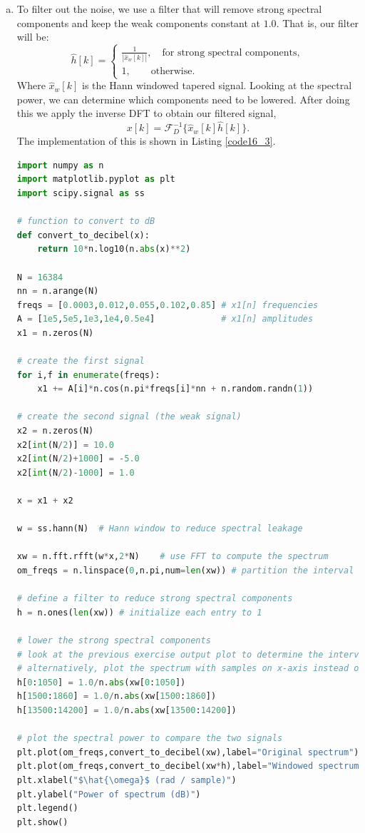 \begin{enumerate}
\begin{enumerate}[a)]
\item To filter out the noise, we use a filter that will remove strong spectral components and keep the 
weak components constant at $1.0$. That is, our filter will be:
$$\hat{h}[k]=\begin{cases}
    \frac{1}{|\hat{x}_{w}[k]|}, \quad \text{for strong spectral components}, \\
    1, \quad\quad \text{otherwise}.
\end{cases}$$
Where $\hat{x}_{w}[k]$ is the Hann windowed tapered signal. Looking at the spectral power, we can determine which components need to be lowered. 
After doing this we apply the inverse DFT to obtain our filtered signal,
$$x[k]=\mathcal{F}_{D}^{-1}\{\hat{x}_{w}[k]\hat{h}[k]\}.$$
The implementation of this is shown in Listing \ref{code16_3}.

\begin{lstlisting}[language=Python, caption=Filtering of the signal,label=code16_3]
import numpy as n
import matplotlib.pyplot as plt
import scipy.signal as ss

# function to convert to dB
def convert_to_decibel(x):
    return 10*n.log10(n.abs(x)**2)

N = 16384
nn = n.arange(N)
freqs = [0.0003,0.012,0.055,0.102,0.85] # x1[n] frequencies
A = [1e5,5e5,1e3,1e4,0.5e4]             # x1[n] amplitudes
x1 = n.zeros(N)

# create the first signal
for i,f in enumerate(freqs):
    x1 += A[i]*n.cos(n.pi*freqs[i]*nn + n.random.randn(1))

# create the second signal (the weak signal)
x2 = n.zeros(N)
x2[int(N/2)] = 10.0
x2[int(N/2)+1000] = -5.0
x2[int(N/2)-1000] = 1.0

x = x1 + x2

w = ss.hann(N)  # Hann window to reduce spectral leakage

xw = n.fft.rfft(w*x,2*N)    # use FFT to compute the spectrum
om_freqs = n.linspace(0,n.pi,num=len(xw)) # partition the interval (0,pi)

# define a filter to reduce strong spectral components
h = n.ones(len(xw)) # initialize each entry to 1

# lower the strong spectral components
# look at the previous exercise output plot to determine the intervals
# alternatively, plot the spectrum with samples on x-axis instead of \hat{\omega}
h[0:1050] = 1.0/n.abs(xw[0:1050])
h[1500:1860] = 1.0/n.abs(xw[1500:1860])
h[13500:14200] = 1.0/n.abs(xw[13500:14200])

# plot the spectral power to compare the two signals
plt.plot(om_freqs,convert_to_decibel(xw),label="Original spectrum")
plt.plot(om_freqs,convert_to_decibel(xw*h),label="Windowed spectrum")
plt.xlabel("$\hat{\omega}$ (rad / sample)")
plt.ylabel("Power of spectrum (dB)")
plt.legend()
plt.show()


\end{lstlisting}
\end{enumerate}
\end{enumerate}
